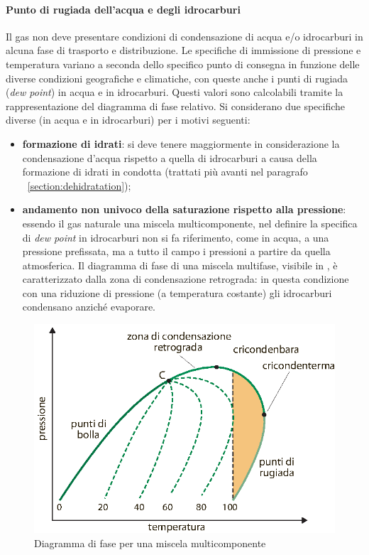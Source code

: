 \paragraph{Punto di rugiada dell'acqua e degli idrocarburi}
Il gas non deve presentare condizioni di condensazione di acqua e/o idrocarburi in alcuna fase di trasporto e distribuzione. Le specifiche di immissione di pressione e temperatura variano a seconda dello specifico punto di consegna in funzione delle diverse condizioni geografiche e climatiche, con queste anche i punti di rugiada (\textit{dew point}) in acqua e in idrocarburi. Questi valori sono calcolabili tramite la rappresentazione del diagramma di fase relativo. Si considerano due specifiche diverse (in acqua e in idrocarburi) per i motivi seguenti:
\begin{itemize}
    \item \textbf{formazione di idrati}: si deve tenere maggiormente in considerazione la condensazione d'acqua rispetto a quella di idrocarburi a causa della formazione di idrati in condotta (trattati più avanti nel paragrafo ~\ref{section:dehidratation});
    \item \textbf{andamento non univoco della saturazione rispetto alla pressione}: essendo il gas naturale una miscela multicomponente, nel definire la specifica di \textit{dew point} in idrocarburi non si fa riferimento, come in acqua, a una pressione prefissata, ma a tutto il campo i pressioni a partire da quella atmosferica. Il diagramma di fase di una miscela multifase, visibile in , è caratterizzato dalla zona di condensazione retrograda: in questa condizione con una riduzione di pressione (a temperatura costante) gli idrocarburi condensano anziché evaporare.
\end{itemize}

\begin{figure}[htbp]
    \centering
    \includegraphics[width=.6\textwidth]{fig/impianti/phasediagram.eps}
    \caption{Diagramma di fase per una miscela multicomponente \parencite{bianco2005impiantigas}}
    \label{fig:phasediagram}
\end{figure}


